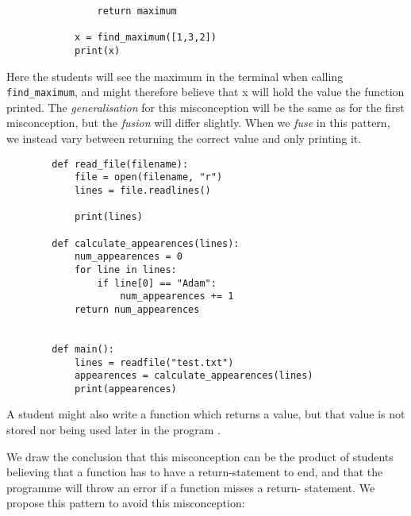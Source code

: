 \begin{enumerate}
\begin{minipage}[t]{0.45\columnwidth}
\begin{verbatim}
                return maximum
    
            x = find_maximum([1,3,2])
            print(x)
        \end{verbatim}
    \end{minipage}
\hfill

    Here the students will see the maximum in the terminal when calling 
\texttt{find_maximum}, and might therefore believe that x 
will hold the value the function printed. The \emph{generalisation} 
for this misconception will be the same as for the first 
misconception, but the \emph{fusion} will differ slightly. When we 
\emph{fuse} in this pattern, we instead vary between returning the 
correct value and only printing it.
     \hfill
        \begin{verbatim}
        def read_file(filename):
            file = open(filename, "r")
            lines = file.readlines()

            print(lines)
            
        def calculate_appearences(lines):
            num_appearences = 0
            for line in lines:
                if line[0] == "Adam":
                    num_appearences += 1
            return num_appearences
            

        def main():
            lines = readfile("test.txt")
            appearences = calculate_appearences(lines)
            print(appearences)
        \end{verbatim}
\hfill
    
\end{enumerate}

A student might also write a function which returns a value, but that 
value is not stored nor being used later in the program 
\parencite{AltadmriBrown2015}.


We draw the conclusion that this misconception can be the product of 
students believing that a function has to have a return-statement to end, 
and that the programme will throw an error if a function misses a return-
statement. We propose this pattern to avoid this misconception:

